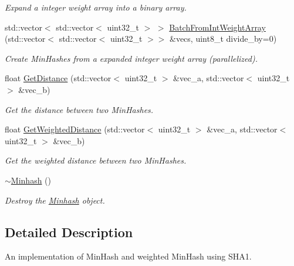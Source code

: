 \begin{DoxyCompactItemize}
\begin{DoxyCompactList}\small\item\em Expand a integer weight array into a binary array. \end{DoxyCompactList}\item 
std\+::vector$<$ std\+::vector$<$ uint32\+\_\+t $>$ $>$ \hyperlink{classtmap_1_1Minhash_a1f2ae587c6b9e98be1cbdc7e9a81c2e7}{Batch\+From\+Int\+Weight\+Array} (std\+::vector$<$ std\+::vector$<$ uint32\+\_\+t $>$$>$ \&vecs, uint8\+\_\+t divide\+\_\+by=0)
\begin{DoxyCompactList}\small\item\em Create Min\+Hashes from a expanded integer weight array (parallelized). \end{DoxyCompactList}\item 
float \hyperlink{classtmap_1_1Minhash_a21df254dd86462a1dcbe45285c747e71}{Get\+Distance} (std\+::vector$<$ uint32\+\_\+t $>$ \&vec\+\_\+a, std\+::vector$<$ uint32\+\_\+t $>$ \&vec\+\_\+b)
\begin{DoxyCompactList}\small\item\em Get the distance between two Min\+Hashes. \end{DoxyCompactList}\item 
float \hyperlink{classtmap_1_1Minhash_a7a8090c1629a6783fe0e17b227bd59ca}{Get\+Weighted\+Distance} (std\+::vector$<$ uint32\+\_\+t $>$ \&vec\+\_\+a, std\+::vector$<$ uint32\+\_\+t $>$ \&vec\+\_\+b)
\begin{DoxyCompactList}\small\item\em Get the weighted distance between two Min\+Hashes. \end{DoxyCompactList}\item 
\mbox{\label{classtmap_1_1Minhash_ae5e1e056f6a1179651b7fa6c196bf220}} 
\hyperlink{classtmap_1_1Minhash_ae5e1e056f6a1179651b7fa6c196bf220}{$\sim$\+Minhash} ()
\begin{DoxyCompactList}\small\item\em Destroy the \hyperlink{classtmap_1_1Minhash}{Minhash} object. \end{DoxyCompactList}\end{DoxyCompactItemize}


\subsection{Detailed Description}
An implementation of Min\+Hash and weighted Min\+Hash using S\+H\+A1. 

